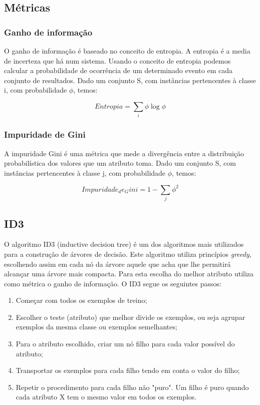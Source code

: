 \documentclass[12pt,a4paper]{article}
\begin{document}
\subsection{Métricas}

\subsubsection{Ganho de informação}
O ganho de informação é baseado no conceito de entropia. A entropia é a media de incerteza que há num sistema. Usando o conceito de entropia podemos calcular a probabilidade de ocorrência de um determinado evento em cada conjunto de resultados.
Dado um conjunto S, com instâncias pertencentes à classe i, com probabilidade  $\phi$, temos:

\begin{equation}
	Entropia = \sum_{i} \phi\log\phi
\end{equation}

\subsubsection{Impuridade de Gini}
A impuridade Gini é uma métrica que mede a divergência entre a distribuição probabilística  dos valores que um atributo toma.
Dado um conjunto S,  com instâncias pertencentes à classe j, com probabilidade  $\phi$, temos\cite{teknomo2017dec}:

\begin{equation}
	Impuridade_de_Gini = 1 - \sum_{j} \phi^{2}
\end{equation}

\subsection{ID3}
O algoritmo ID3 (inductive decision tree) é um dos algoritmos mais utilizados para a construção de árvores de decisão. Este algoritmo utiliza princípios \textit{greedy}, escolhendo assim em cada nó da árvore aquele que acha que lhe permitirá alcançar uma árvore mais compacta. Para esta escolha do melhor atributo utiliza como métrica o ganho de informação. 
O ID3 segue os seguintes passos:
\begin{enumerate}
	\item 	Começar com todos os exemplos de treino;
	\item	Escolher o teste (atributo) que melhor divide os exemplos, ou seja agrupar exemplos da mesma classe ou exemplos semelhantes;
	\item	Para o atributo escolhido, criar um nó filho para cada valor possível do atributo;
	\item	Transportar os exemplos para cada filho tendo em conta o valor do filho;
	\item	Repetir o procedimento para cada filho não "puro". Um filho é puro quando cada atributo X tem o mesmo valor em todos os exemplos. 
\end{enumerate}
\end{document}

